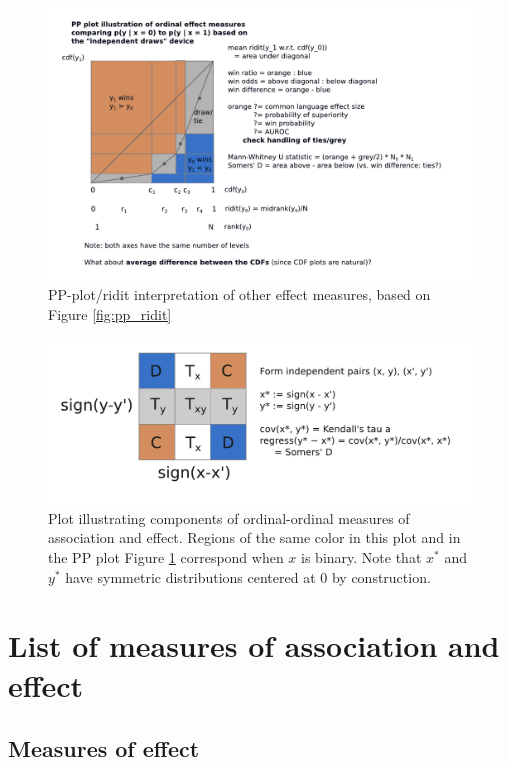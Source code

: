 \documentclass[
  11pt,
  fleqn
]{article}
\begin{document}
\begin{figure}
  \includegraphics[width=6.5in]{effect_measures_pp_plot.pdf}
  \caption{PP-plot/ridit interpretation of other effect measures,
  based on Figure \ref{fig:pp_ridit}}
  \label{fig:pp_effect_measures}
\end{figure}

\begin{figure}
  \includegraphics[width=6.5in]{ordinal_xy_pair_signs_plot.pdf}
  \caption{Plot illustrating components of ordinal-ordinal measures
    of association and effect. Regions of the same color in this plot
    and in the PP plot Figure \ref{fig:pp_effect_measures} correspond
    when $x$ is binary. Note that $x^*$ and $y^*$ have symmetric
  distributions centered at 0 by construction.}
  \label{fig:ordinal_xy}
\end{figure}

\section{List of measures of association and effect}

\subsection{Measures of effect}
\end{document}
